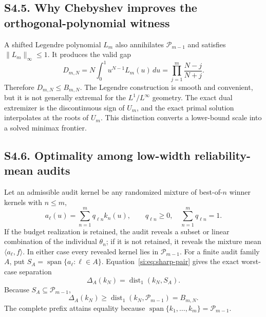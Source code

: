 \documentclass[10pt,twocolumn]{article}
\newcommand{\cP}{\mathcal P}
\newcommand{\dist}{\operatorname{dist}}
\newcommand{\Span}{\operatorname{span}}
\begin{document}
\subsection*{S4.5. Why Chebyshev improves the orthogonal-polynomial witness}

A shifted Legendre polynomial $L_m$ also annihilates $\cP_{m-1}$ and satisfies $\|L_m\|_\infty\le1$. It produces the valid gap
\begin{equation}
D_{m,N}=N\int_0^1u^{N-1}L_m(u)\,du
=\prod_{j=1}^m\frac{N-j}{N+j}.
\label{si:eq:legendre-gap}
\end{equation}
Therefore $D_{m,N}\le B_{m,N}$. The Legendre construction is smooth and convenient, but it is not generally extremal for the $L^1/L^\infty$ geometry. The exact dual extremizer is the discontinuous sign of $U_m$, and the exact primal solution interpolates at the roots of $U_m$. This distinction converts a lower-bound scale into a solved minimax frontier.

\subsection*{S4.6. Optimality among low-width reliability-mean audits}

Let an admissible audit kernel be any randomized mixture of best-of-$n$ winner kernels with $n\le m$,
\begin{equation}
a_\ell(u)=\sum_{n=1}^m q_{\ell n}k_n(u),
\qquad q_{\ell n}\ge0,
\quad \sum_{n=1}^m q_{\ell n}=1.
\label{si:eq:mixed-audit}
\end{equation}
If the budget realization is retained, the audit reveals a subset or linear combination of the individual $\theta_n$; if it is not retained, it reveals the mixture mean $\langle a_\ell,f\rangle$. In either case every revealed kernel lies in $\mathcal P_{m-1}$. For a finite audit family $A$, put $S_A=\Span\{a_\ell:\ell\in A\}$. Equation~\ref{si:eq:sharp-pair} gives the exact worst-case separation
\begin{equation}
\Delta_A(k_N)=\dist_1(k_N,S_A).
\label{si:eq:audit-family-distance}
\end{equation}
Because $S_A\subseteq\mathcal P_{m-1}$,
\begin{equation}
\Delta_A(k_N)
\ge \dist_1(k_N,\mathcal P_{m-1})
=B_{m,N}.
\label{si:eq:audit-family-lower}
\end{equation}
The complete prefix attains equality because $\Span\{k_1,\ldots,k_m\}=\mathcal P_{m-1}$.
\end{document}
